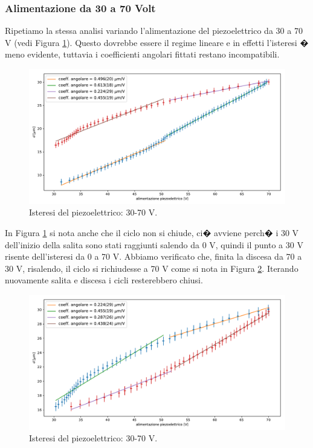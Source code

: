 \documentclass[a4paper]{article}
\begin{document}
\begin{multicols}{2}

\subsubsection{Alimentazione da 30 a 70 Volt}
Ripetiamo la stessa analisi variando l'alimentazione del piezoelettrico da 30 a 70 V (vedi Figura \ref{fig:30-70-1}). Questo dovrebbe essere il regime lineare e in effetti l'isteresi � meno evidente, tuttavia i coefficienti angolari fittati restano incompatibili.

\end{multicols}

\begin{figure}[H]
	\includegraphics[width=1\textwidth]{isteresi_30-70-1.pdf}
	\caption{Isteresi del piezoelettrico: 30-70 V.}
	\label{fig:30-70-1}
\end{figure}

\begin{multicols}{2}

 In Figura \ref{fig:30-70-1} si nota anche che il ciclo non si chiude, ci� avviene perch� i 30 V dell'inizio della salita sono stati raggiunti salendo da 0 V, quindi il punto a 30 V risente dell'isteresi da 0 a 70 V. Abbiamo verificato che, finita la discesa da 70 a 30 V, risalendo, il ciclo si richiudesse a 70 V come si nota in Figura \ref{fig:30-70-2}. Iterando nuovamente salita e discesa i cicli resterebbero chiusi.
 
 \end{multicols}
 
 \begin{figure}[H]
 	\includegraphics[width=1\textwidth]{isteresi_30-70-2.pdf}
 	\caption{Isteresi del piezoelettrico: 30-70 V.}
 	\label{fig:30-70-2}
 \end{figure}
 
\end{document}
